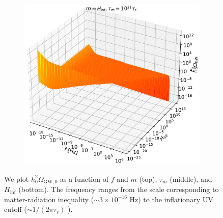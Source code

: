 \documentclass[prd,twocolumn,aps,psfig,nofootinbib,nobibnotes,superscriptaddress,preprintnumbers,times]{revtex4-2}
\begin{document}
\begin{figure}
\begin{subfigure}{.5\textwidth}
  \includegraphics[width=.88\linewidth]{fig2c.pdf}  
  \label{fig:contour-c}
\end{subfigure}
\caption{We plot $h_0^2\Omega_{\text{GW},0}$ as a function of $f$ and $m$ (top), $\tau_m$ (middle), and $H_{\inf}$ (bottom). The frequency ranges from the scale corresponding to matter-radiation inequality ($\sim 3\times10^{-16}$ Hz) to the inflationary UV cutoff ($\sim 1/(2\pi\tau_r)$ \cite{Fujita:2018ehq}).} 
\label{fig:contours}
\end{figure}
\end{document}
